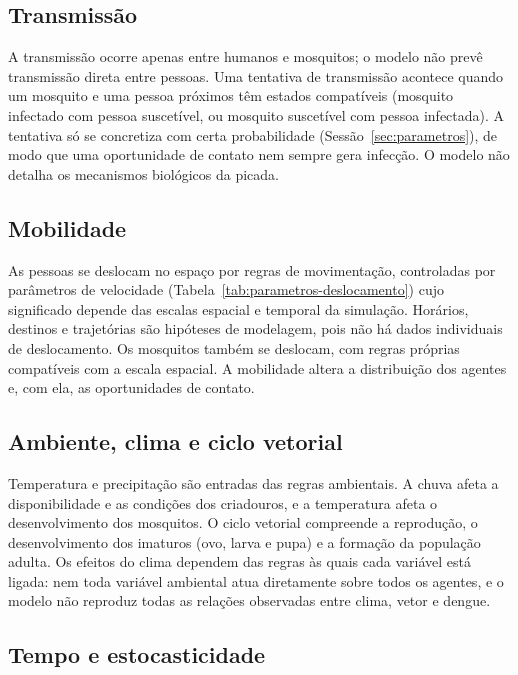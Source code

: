 \subsection{Transmissão}

A transmissão ocorre apenas entre humanos e mosquitos; o modelo não prevê transmissão direta entre pessoas. Uma tentativa de transmissão acontece quando um mosquito e uma pessoa próximos têm estados compatíveis (mosquito infectado com pessoa suscetível, ou mosquito suscetível com pessoa infectada). A tentativa só se concretiza com certa probabilidade (Sessão~\ref{sec:parametros}), de modo que uma oportunidade de contato nem sempre gera infecção. O modelo não detalha os mecanismos biológicos da picada.

\subsection{Mobilidade}

As pessoas se deslocam no espaço por regras de movimentação, controladas por parâmetros de velocidade (Tabela~\ref{tab:parametros-deslocamento}) cujo significado depende das escalas espacial e temporal da simulação. Horários, destinos e trajetórias são hipóteses de modelagem, pois não há dados individuais de deslocamento. Os mosquitos também se deslocam, com regras próprias compatíveis com a escala espacial. A mobilidade altera a distribuição dos agentes e, com ela, as oportunidades de contato.

\subsection{Ambiente, clima e ciclo vetorial}

Temperatura e precipitação são entradas das regras ambientais. A chuva afeta a disponibilidade e as condições dos criadouros, e a temperatura afeta o desenvolvimento dos mosquitos. O ciclo vetorial compreende a reprodução, o desenvolvimento dos imaturos (ovo, larva e pupa) e a formação da população adulta. Os efeitos do clima dependem das regras às quais cada variável está ligada: nem toda variável ambiental atua diretamente sobre todos os agentes, e o modelo não reproduz todas as relações observadas entre clima, vetor e dengue.

\subsection{Tempo e estocasticidade}

